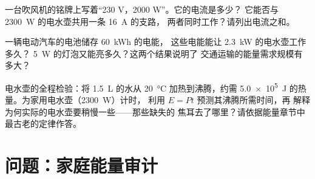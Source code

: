 \begin{exercise}[$\star\star$]\label{exo:g9:electric-power-energy:10}
一台吹风机的铭牌上写着“230 V，2000 W”。它的电流是多少？
它能否与 \qty{2300}{W} 的电水壶共用一条 \qty{16}{A} 的支路，
两者同时工作？请列出电流之和。
\end{exercise}

\begin{exercise}[$\star\star$]\label{exo:g9:electric-power-energy:11}
一辆电动汽车的电池储存 \qty{60}{kWh} 的电能，
这些电能能让 \qty{2.3}{kW} 的电水壶工作多久？
\qty{5}{W} 的灯泡又能亮多久？这两个结果说明了
交通运输的能量需求规模有多大？
\end{exercise}

\begin{exercise}[$\star\star\star$]\label{exo:g9:electric-power-energy:12}
电水壶的全程检验：将 \qty{1.5}{L} 的水从
\qty{20}{\celsius} 加热到沸腾，约需 \qty{5.0e5}{J}
的热量。为家用电水壶（\qty{2300}{W}）计时，
利用 $E = P t$ 预测其沸腾所需时间，再
解释为何实际的电水壶要稍慢一些——那些缺失的
焦耳去了哪里？请依据能量章节中最古老的定律作答。
\end{exercise}

\section{问题：家庭能量审计}

